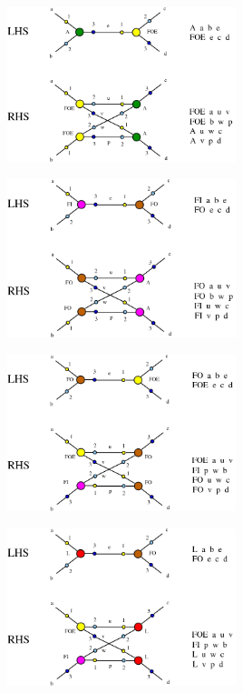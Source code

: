 \documentclass{article}
\begin{document}
\centerline{\includegraphics[width=0.5\textwidth]{../img/A-FOE.jpg}
}
\vspace{.5cm}


\vspace{.5cm}
 
\centerline{\includegraphics[width=0.5\textwidth]{../img/FI-FO.jpg}
}
\vspace{.5cm}

\centerline{\includegraphics[width=0.5\textwidth]{../img/FO-FOE.jpg}
}
\vspace{.5cm}



\vspace{.5cm}
 
\centerline{\includegraphics[width=0.5\textwidth]{../img/L-FO.jpg}
}
\vspace{.5cm}
\end{document}
